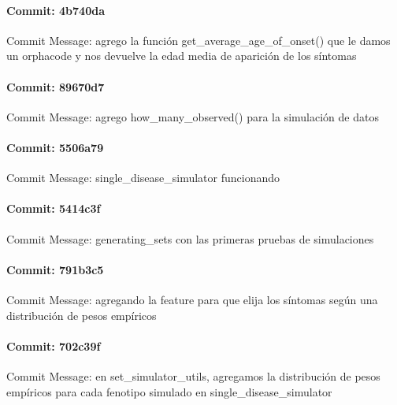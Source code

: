 \documentclass{article}
\begin{document}
\paragraph{Commit: 4b740da}
Commit Message: agrego la función get_average_age_of_onset() que le damos un orphacode y nos devuelve la edad media de aparición de los síntomas

\paragraph{Commit: 89670d7}
Commit Message: agrego how_many_observed() para la simulación de datos

\paragraph{Commit: 5506a79}
Commit Message: single_disease_simulator funcionando

\paragraph{Commit: 5414c3f}
Commit Message: generating_sets con las primeras pruebas de simulaciones

\paragraph{Commit: 791b3c5}
Commit Message: agregando la feature para que elija los síntomas según una distribución de pesos empíricos

\paragraph{Commit: 702c39f}
Commit Message: en set_simulator_utils, agregamos la distribución de pesos empíricos para cada fenotipo simulado en single_disease_simulator

\end{document}
